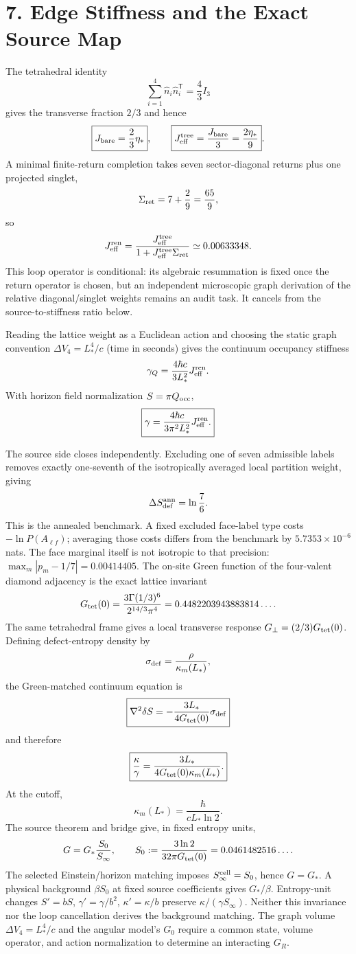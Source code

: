 \documentclass[11pt]{article}
\begin{document}
\section{7. Edge Stiffness and the Exact Source Map}

The tetrahedral identity
\[
\sum_{i=1}^4\hat n_i\hat n_i^{\mathsf T}=\frac43I_3
\]
gives the transverse fraction $2/3$ and hence
\[
\boxed{J_{\rm bare}=\frac23\eta_*},
\qquad
\boxed{J_{\rm eff}^{\rm tree}=\frac{J_{\rm bare}}{3}=\frac{2\eta_*}{9}}.
\]
A minimal finite-return completion takes seven sector-diagonal returns plus one projected singlet,
\[
\Sigma_{\rm ret}=7+\frac29=\frac{65}{9},
\]
so
\[
J_{\rm eff}^{\rm ren}
=\frac{J_{\rm eff}^{\rm tree}}
{1+J_{\rm eff}^{\rm tree}\Sigma_{\rm ret}}
\simeq0.00633348.
\]
This loop operator is conditional: its algebraic resummation is fixed once the return operator is chosen, but an independent microscopic graph derivation of the relative diagonal/singlet weights remains an audit task. It cancels from the source-to-stiffness ratio below.

Reading the lattice weight as a Euclidean action and choosing the static graph convention $\Delta V_4=L_*^4/c$ (time in seconds) gives the continuum occupancy stiffness
\[
\gamma_Q=\frac{4\hbar c}{3L_*^2}J_{\rm eff}^{\rm ren}.
\]
With horizon field normalization $S=\pi Q_{\rm occ}$,
\[
\boxed{
\gamma
=\frac{4\hbar c}{3\pi^2L_*^2}J_{\rm eff}^{\rm ren}.
}
\]

The source side closes independently. Excluding one of seven admissible labels removes exactly one-seventh of the isotropically averaged local partition weight, giving
\[
\Delta S_{\rm def}^{\rm ann}=\ln\frac76.
\]
This is the annealed benchmark. A fixed excluded face-label type costs $-\ln P(A_{\ell f})$; averaging those costs differs from the benchmark by $5.7353\times10^{-6}$ nats. The face marginal itself is not isotropic to that precision: $\max_m|p_m-1/7|=0.00414405$.
The on-site Green function of the four-valent diamond adjacency is the exact lattice invariant
\[
G_{\rm tet}(0)
=\frac{3\Gamma(1/3)^6}{2^{14/3}\pi^4}
=0.4482203943883814\ldots.
\]
The same tetrahedral frame gives a local transverse response $G_\perp=(2/3)G_{\rm tet}(0)$. Defining defect-entropy density by
\[
\sigma_{\rm def}=\frac{\rho}{\kappa_m(L_*)},
\]
the Green-matched continuum equation is
\[
\boxed{
\nabla^2\delta S
=-\frac{3L_*}{4G_{\rm tet}(0)}\sigma_{\rm def}
}
\]
and therefore
\[
\boxed{
\frac{\kappa}{\gamma}
=\frac{3L_*}{4G_{\rm tet}(0)\kappa_m(L_*)}.
}
\]
At the cutoff,
\[
\kappa_m(L_*)=\frac{\hbar}{cL_*\ln2}.
\]
The source theorem and bridge give, in fixed entropy units,
\[
G=G_*\frac{S_0}{S_\infty},\qquad
S_0:=\frac{3\ln2}{32\pi G_{\rm tet}(0)}=0.0461482516\ldots.
\]
The selected Einstein/horizon matching imposes $S_\infty^{\rm cell}=S_0$, hence $G=G_*$. A physical background $\beta S_0$ at fixed source coefficients gives $G_*/\beta$. Entropy-unit changes $S'=bS$, $\gamma'=\gamma/b^2$, $\kappa'=\kappa/b$ preserve $\kappa/(\gamma S_\infty)$. Neither this invariance nor the loop cancellation derives the background matching. The graph volume $\Delta V_4=L_*^4/c$ and the angular model's $G_0$ require a common state, volume operator, and action normalization to determine an interacting $G_R$.
\end{document}
